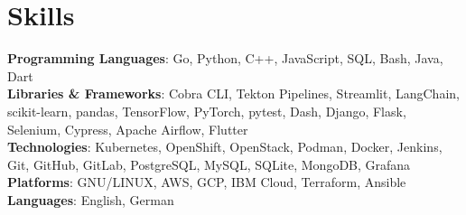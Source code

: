 \section{Skills}
    \begin{itemize}[leftmargin=0.15in, label={}]
	\small{\item{
		\textbf{Programming Languages}{: Go, Python, C++, JavaScript, SQL, Bash, Java, Dart} \\
		\textbf{Libraries \& Frameworks}{: Cobra CLI, Tekton Pipelines, Streamlit, LangChain, scikit-learn, pandas, TensorFlow, PyTorch, pytest, Dash, Django, Flask, Selenium, Cypress, Apache Airflow, Flutter} \\
		\textbf{Technologies}{: Kubernetes, OpenShift, OpenStack, Podman, Docker, Jenkins, Git, GitHub, GitLab, PostgreSQL, MySQL, SQLite, MongoDB, Grafana} \\
		\textbf{Platforms}{: GNU/LINUX, AWS, GCP, IBM Cloud, Terraform, Ansible} \\
  		\textbf{Languages}{: English, German}
	}}
    \end{itemize}